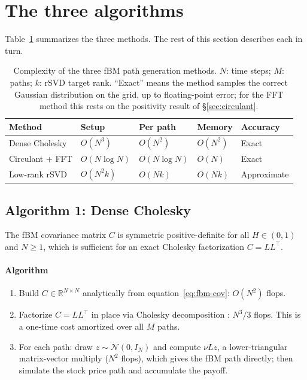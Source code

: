 \section{The three algorithms}
\label{sec:algorithms}

Table~\ref{tab:complexity} summarizes the three methods.  The rest of this section
describes each in turn.

\begin{table}[t]
  \caption{Complexity of the three fBM path generation methods.  $N$: time steps;
    $M$: paths; $k$: rSVD target rank.  ``Exact'' means the method samples the
    correct Gaussian distribution on the grid, up to floating-point error; for the
    FFT method this rests on the positivity result of §\ref{sec:circulant}.}
  \label{tab:complexity}
  \centering
  \begin{tabular}{lllll}
    \toprule
    Method & Setup & Per path & Memory & Accuracy \\
    \midrule
    Dense Cholesky   & $O(N^3)$        & $O(N^2)$        & $O(N^2)$  & Exact \\
    Circulant + FFT  & $O(N\log N)$    & $O(N\log N)$    & $O(N)$    & Exact \\
    Low-rank rSVD    & $O(N^2 k)$      & $O(Nk)$         & $O(Nk)$   & Approximate \\
    \bottomrule
  \end{tabular}
\end{table}

\subsection{Algorithm 1: Dense Cholesky}
\label{sec:cholesky}

The fBM covariance matrix $C$ is symmetric positive-definite for all $H \in (0,1)$
and $N \geq 1$, which is sufficient for an exact Cholesky factorization $C = LL^\top$.

\paragraph{Algorithm}
\begin{enumerate}
  \item Build $C \in \mathbb{R}^{N\times N}$ analytically from
        equation~\eqref{eq:fbm-cov}: $O(N^2)$ flops.
  \item Factorize $C = LL^\top$ in place via Cholesky decomposition
        \citep{golub2013matrix}: $N^3/3$ flops.  This is a one-time cost amortized
        over all $M$ paths.
  \item For each path: draw $z \sim \mathcal{N}(0, I_N)$ and compute $\nu Lz$, a
        lower-triangular matrix-vector multiply ($N^2$ flops), which gives the fBM
        path directly; then simulate the stock price path and accumulate the payoff.
\end{enumerate}

